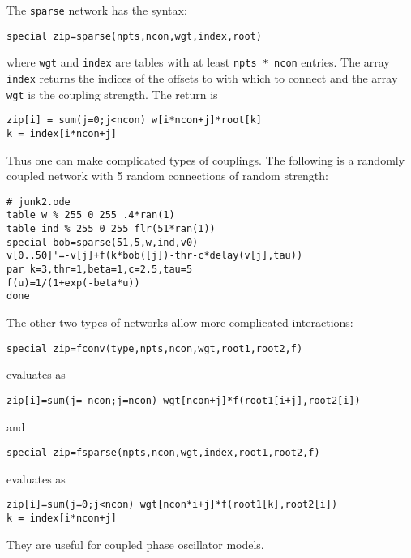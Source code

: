 \documentclass{article}
\begin{document}
The {\tt sparse} network has the syntax:
\begin{verbatim}
special zip=sparse(npts,ncon,wgt,index,root)
\end{verbatim}
where {\tt wgt} and {\tt index} are tables with at least {\tt npts *
ncon} entries.   The array {\tt index} returns the indices of the
offsets to with which to connect and the array {\tt wgt} is the
coupling strength. The return is
\begin{verbatim}
zip[i] = sum(j=0;j<ncon) w[i*ncon+j]*root[k]
k = index[i*ncon+j] 
\end{verbatim}
Thus one can make complicated types of couplings. The following is a
randomly coupled network with 5 random connections of random strength:
\begin{verbatim}
# junk2.ode
table w % 255 0 255 .4*ran(1)
table ind % 255 0 255 flr(51*ran(1))
special bob=sparse(51,5,w,ind,v0)
v[0..50]'=-v[j]+f(k*bob([j])-thr-c*delay(v[j],tau))
par k=3,thr=1,beta=1,c=2.5,tau=5
f(u)=1/(1+exp(-beta*u))
done
\end{verbatim}

The other two types of networks allow more complicated interactions:
\begin{verbatim}
special zip=fconv(type,npts,ncon,wgt,root1,root2,f)
\end{verbatim}
evaluates as 
\begin{verbatim}
zip[i]=sum(j=-ncon;j=ncon) wgt[ncon+j]*f(root1[i+j],root2[i])
\end{verbatim}

and 

\begin{verbatim}
special zip=fsparse(npts,ncon,wgt,index,root1,root2,f)
\end{verbatim}
evaluates as 
\begin{verbatim}
zip[i]=sum(j=0;j<ncon) wgt[ncon*i+j]*f(root1[k],root2[i])
k = index[i*ncon+j] 
\end{verbatim}

They are useful for coupled phase oscillator models.
\end{document}
